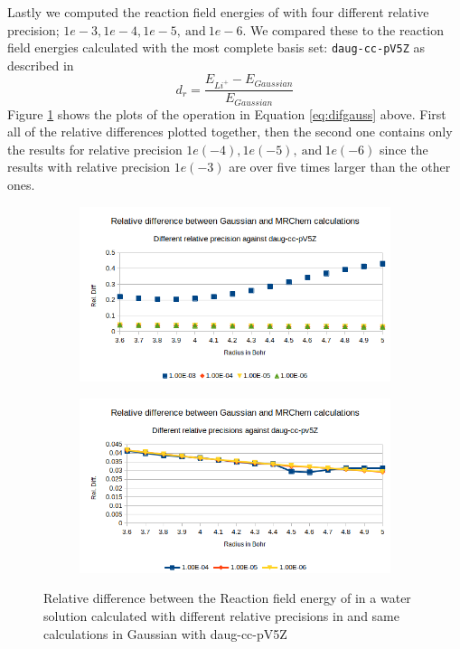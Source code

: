 \documentclass[../master_thesis.tex]{subfiles}
\begin{document}
Lastly we computed the reaction field energies of  with four different
relative precision; $1e-3, 1e-4, 1e-5,\  \text{and}\  1e-6$. We compared these
to the reaction field energies calculated with the most complete basis set:
\verb!daug-cc-pV5Z! as described in
\begin{equation}\label{eq:difgauss}
    d_r = \frac{E_{Li^+} - E_{Gaussian}}{E_{Gaussian}}
\end{equation}
Figure \ref{fig:lipprecreldef} shows the plots of the operation in Equation \ref{eq:difgauss} above.
First all of the relative differences plotted together, then the second one contains
only the results for relative precision $1e(-4), 1e(-5),\  \text{and}\  1e(-6)$ since
the results with relative precision $1e(-3)$ are over five times larger than the other ones.

\begin{figure}[h!]
  \centering
  \begin{subfigure}[b]{0.75\linewidth}
    \includegraphics[width=\linewidth]{img/lipprecallreldiff.png}
  \end{subfigure}
  \begin{subfigure}[b]{0.75\linewidth}
    \includegraphics[width=\linewidth]{img/lipprecallreldiffexcl.png}
  \end{subfigure}
  \caption{Relative difference between the Reaction field energy of  in a water solution calculated with different relative precisions in \mrchem  and same calculations in Gaussian with daug-cc-pV5Z}
  \label{fig:lipprecreldef}
\end{figure}
\end{document}
